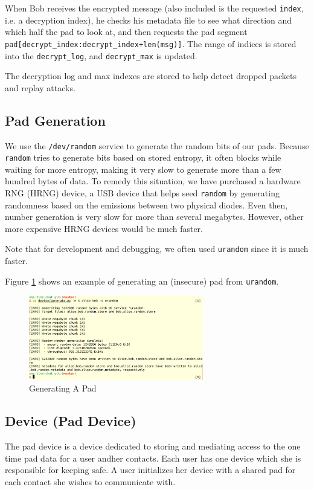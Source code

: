 \documentclass[twocolumn]{article}
\begin{document}
When Bob receives the encrypted message (also included is the requested \texttt{index}, i.e. a decryption index), he checks his metadata file to see what direction and which half the pad to look at, and then requests the pad segment \texttt{pad[decrypt\_index:decrypt\_index+len(msg)]}. The range of indices is stored into the \texttt{decrypt\_log}, and \texttt{decrypt\_max} is updated.

The decryption log and max indexes are stored to help detect dropped packets and replay attacks.

\subsection{Pad Generation}
\label{sec:padgen}
We use the \texttt{/dev/random} service to generate the random bits of our pads. Because \texttt{random} tries to generate bits based on stored entropy, it often blocks while waiting for more entropy, making it very slow to generate more than a few hundred bytes of data. To remedy this situation, we have purchased a hardware RNG (HRNG) device, a USB device that helps seed \texttt{random} by generating randomness based on the emissions between two physical diodes. Even then, number generation is very slow for more than several megabytes. However, other more expensive HRNG devices would be much faster.

Note that for development and debugging, we often used \texttt{urandom} since it is much faster.

Figure \ref{fig:genpad} shows an example of generating an (insecure) pad from \texttt{urandom}.

\begin{figure}[htp]
\centering
\includegraphics[width=3in]{generate}
\caption{Generating A Pad}
\label{fig:genpad}
\end{figure}


\subsection{Device (Pad Device)}
The pad device is a device dedicated to storing and mediating access to the one time pad data for a user andher contacts. Each user has one device which she is responsible for keeping safe. A user initializes her device with a shared pad for each contact she wishes to communicate with.
\end{document}
